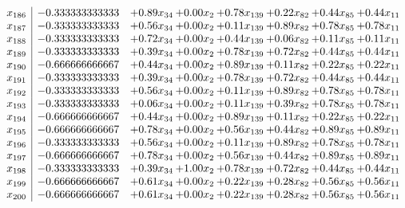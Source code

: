 \documentclass[8pt]{article}
\begin{document}
\[\begin{array}{c| c c@{\hskip 2pt} c@{\hskip 2pt} c@{\hskip 2pt} c@{\hskip 2pt} c@{\hskip 2pt} c@{\hskip 2pt} }
 x_{186}   &  -0.333333333333 & +  0.89 x_{34} & +  0.00 x_{2} & +  0.78 x_{139} & +  0.22 x_{82} & +  0.44 x_{85} & +  0.44 x_{11}\\
 x_{187}   &  -0.333333333333 & +  0.56 x_{34} & +  0.00 x_{2} & +  0.11 x_{139} & +  0.89 x_{82} & +  0.78 x_{85} & +  0.78 x_{11}\\
 x_{188}   &  -0.333333333333 & +  0.72 x_{34} & +  0.00 x_{2} & +  0.44 x_{139} & +  0.06 x_{82} & +  0.11 x_{85} & +  0.11 x_{11}\\
 x_{189}   &  -0.333333333333 & +  0.39 x_{34} & +  0.00 x_{2} & +  0.78 x_{139} & +  0.72 x_{82} & +  0.44 x_{85} & +  0.44 x_{11}\\
 x_{190}   &  -0.666666666667 & +  0.44 x_{34} & +  0.00 x_{2} & +  0.89 x_{139} & +  0.11 x_{82} & +  0.22 x_{85} & +  0.22 x_{11}\\
 x_{191}   &  -0.333333333333 & +  0.39 x_{34} & +  0.00 x_{2} & +  0.78 x_{139} & +  0.72 x_{82} & +  0.44 x_{85} & +  0.44 x_{11}\\
 x_{192}   &  -0.333333333333 & +  0.56 x_{34} & +  0.00 x_{2} & +  0.11 x_{139} & +  0.89 x_{82} & +  0.78 x_{85} & +  0.78 x_{11}\\
 x_{193}   &  -0.333333333333 & +  0.06 x_{34} & +  0.00 x_{2} & +  0.11 x_{139} & +  0.39 x_{82} & +  0.78 x_{85} & +  0.78 x_{11}\\
 x_{194}   &  -0.666666666667 & +  0.44 x_{34} & +  0.00 x_{2} & +  0.89 x_{139} & +  0.11 x_{82} & +  0.22 x_{85} & +  0.22 x_{11}\\
 x_{195}   &  -0.666666666667 & +  0.78 x_{34} & +  0.00 x_{2} & +  0.56 x_{139} & +  0.44 x_{82} & +  0.89 x_{85} & +  0.89 x_{11}\\
 x_{196}   &  -0.333333333333 & +  0.56 x_{34} & +  0.00 x_{2} & +  0.11 x_{139} & +  0.89 x_{82} & +  0.78 x_{85} & +  0.78 x_{11}\\
 x_{197}   &  -0.666666666667 & +  0.78 x_{34} & +  0.00 x_{2} & +  0.56 x_{139} & +  0.44 x_{82} & +  0.89 x_{85} & +  0.89 x_{11}\\
 x_{198}   &  -0.333333333333 & +  0.39 x_{34} & +  1.00 x_{2} & +  0.78 x_{139} & +  0.72 x_{82} & +  0.44 x_{85} & +  0.44 x_{11}\\
 x_{199}   &  -0.666666666667 & +  0.61 x_{34} & +  0.00 x_{2} & +  0.22 x_{139} & +  0.28 x_{82} & +  0.56 x_{85} & +  0.56 x_{11}\\
 x_{200}   &  -0.666666666667 & +  0.61 x_{34} & +  0.00 x_{2} & +  0.22 x_{139} & +  0.28 x_{82} & +  0.56 x_{85} & +  0.56 x_{11}\\

\end{array}\]
\end{document}
